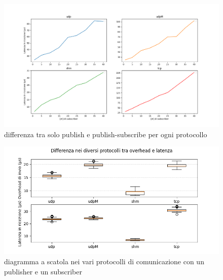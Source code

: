 \begin{figure}[H]
    \includegraphics[width=\textwidth]{./results/test3_different_protocol_send_receive.png} 
        \caption{differenza tra solo publish e publish-subscribe per ogni protocollo}\label{fig:test3_different_protocols}%
\end{figure}

\begin{figure}[H]
    \includegraphics[width=\textwidth]{./results/test1_box_sr_1p1s.png} 
        \caption{diagramma a scatola nei vari protocolli di comunicazione con un publisher e un subscriber}\label{fig:test1sdbox}
\end{figure}

